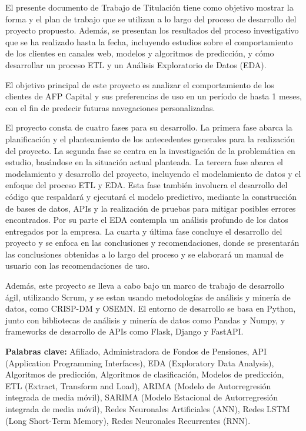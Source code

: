 El presente documento de Trabajo de Titulación tiene como objetivo mostrar la forma y el plan de trabajo que se utilizan a lo largo del proceso de desarrollo del proyecto propuesto. Además, se presentan los resultados del proceso investigativo que se ha realizado hasta la fecha, incluyendo estudios sobre el comportamiento de los clientes en canales web, modelos y algoritmos de predicción, y cómo desarrollar un proceso ETL y un Análisis Exploratorio de Datos (EDA).

El objetivo principal de este proyecto es analizar el comportamiento de los clientes de AFP Capital y sus preferencias de uso en un período de hasta 1 meses, con el fin de predecir futuras navegaciones personalizadas.

El proyecto consta de cuatro fases para su desarrollo. La primera fase abarca la planificación y el planteamiento de los antecedentes generales para la realización del proyecto. La segunda fase se centra en la investigación de la problemática en estudio, basándose en la situación actual planteada. La tercera fase abarca el modelamiento y desarrollo del proyecto, incluyendo el modelamiento de datos y el enfoque del proceso ETL y EDA. Esta fase también involucra el desarrollo del código que respaldará y ejecutará el modelo predictivo, mediante la construcción de bases de datos, APIs y la realización de pruebas para mitigar posibles errores encontrados. Por su parte el EDA contempla un análisis profundo de los datos entregados por la empresa. La cuarta y última fase concluye el desarrollo del proyecto y se enfoca en las conclusiones y recomendaciones, donde se presentarán las conclusiones obtenidas a lo largo del proceso y se elaborará un manual de usuario con las recomendaciones de uso.

Además, este proyecto se lleva a cabo bajo un marco de trabajo de desarrollo ágil, utilizando Scrum, y se estan usando metodologías de análisis y minería de datos, como CRISP-DM y OSEMN. El entorno de desarrollo se basa en Python, junto con bibliotecas de análisis y minería de datos como Pandas y Numpy, y frameworks de desarrollo de APIs como Flask, Django y FastAPI.


\textbf{Palabras clave:}  Afiliado, Administradora de Fondos de Pensiones, API (Application Programming Interfaces), EDA (Exploratory Data Analysis), Algoritmos de predicción, Algoritmos de clasificación, Modelos de predicción, ETL (Extract, Transform and Load), ARIMA (Modelo de Autorregresión integrada de media móvil), SARIMA (Modelo Estacional de Autorregresión integrada de media móvil), Redes Neuronales Artificiales (ANN), Redes LSTM (Long Short-Term Memory), Redes Neuronales Recurrentes (RNN).
